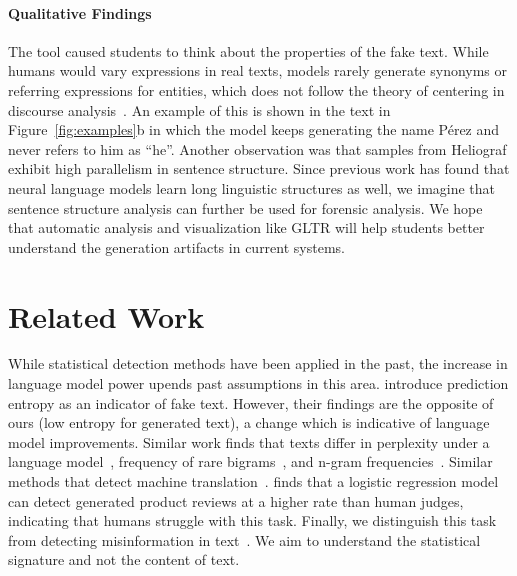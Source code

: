 \documentclass[11pt,a4paper]{article}
\begin{document}
\paragraph{Qualitative Findings}
The tool caused students to think about the properties of the fake text. While humans would vary expressions in real texts, models rarely generate synonyms or referring expressions for entities, which does not follow the theory of centering in discourse analysis~\citep{grosz1995centering}.
An example of this is shown in the text in Figure~\ref{fig:examples}b in which the model keeps generating the name P\'erez and never refers to him as “he”.
Another observation was that samples from Heliograf exhibit high parallelism in sentence structure. Since previous work has found that neural language models learn long linguistic structures as well, we imagine that sentence structure analysis can further be used for forensic analysis. We hope that automatic analysis and visualization like GLTR will help students better understand the generation artifacts in current systems.

\section{Related Work}

While statistical detection methods have been applied in the past, the increase in language model power upends past assumptions in this area. \citet{lavergne2008detecting} introduce prediction entropy as an indicator of fake text. However, their findings are the opposite of ours (low entropy for generated text), a change which is indicative of language model improvements. Similar work finds that texts differ in perplexity under a language model~\citep{beresneva2016computer}, frequency of rare bigrams~\citep{grechnikov2009detection}, and n-gram frequencies~\citep{badaskar2008identifying}. Similar methods that detect machine translation~\citep{arase2013machine}. \citet{hovy2016enemy} finds that a logistic regression model can detect generated product reviews at a higher rate than human judges, indicating that humans struggle with this task. %
Finally, we distinguish this task from detecting misinformation in text~\citep[e.g.][]{shu2017fake}. We aim to understand the statistical signature and not the content of text.
\end{document}
